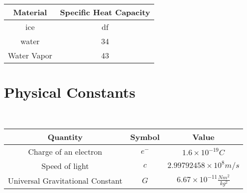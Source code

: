 \newpage




\begin{table}[h]
	\caption{\label{tab:specificheat}Table of Specific Heat Capacities of Common Materials}
	
	\begin{longtable}{|c |c|}
		\hline
		Material & Specific Heat Capacity  \\
		\hline
		ice & df \\
		\hline
		water & 34  \\
		\hline
		Water Vapor &  43 \\
		\hline
		
	\end{longtable}
\end{table}
 \newpage




\section{Physical Constants}

\
\begin{table}[h]
	\caption{\label{tab:Constants}Table of Common Physical Constants}
	
	\begin{longtable}{|c |c| c |}
		\hline
		Quantity & Symbol & Value \\
		\hline
		Charge of an electron & $e^-$ & $1.6 \times 10^{-19}\si{C}$ \\
		\hline
		Speed of light & $c$ & $2.99792458 \times 10^8 \si{m/s}$ \\
		\hline
		Universal Gravitational Constant &  $G$ & $6.67 \times 10^{-11} \si{\frac{Nm^2}{kg^2}}$ \\
		\hline
	
	\end{longtable}
\end{table}
